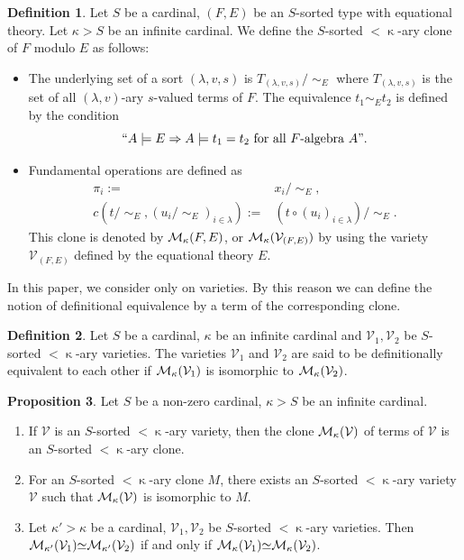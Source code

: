 \documentclass[a4paper,10pt]{article}
\theoremstyle{definition}
\newtheorem{df}{Definition}[section]
\newtheorem{prop}[df]{Proposition}
\newcommand\iso{{\simeq}}
\newcommand\mc{\mathclose}
\newcommand\V{\mathcal{V}}
\begin{document}
\begin{df}
Let $S$ be a cardinal, $(F,E)$ be an $S$-sorted type with equational theory.
Let $\kappa>S$ be an infinite cardinal.
We define the $S$-sorted $<\mc\kappa$-ary clone of $F$ modulo $E$ as follows:
\begin{itemize}
\item
The underlying set of a sort $(\lambda,v,s)$
is $T_{(\lambda,v,s)}/\mc\sim_E$ where
$T_{(\lambda,v,s)}$ is the set of all $(\lambda,v)$-ary $s$-valued terms of $F$.
The equivalence $t_1\sim_E t_2$
is defined by the condition
\[
``A\models E\Rightarrow A\models t_1=t_2\text{ for all }
F\text{-algebra }A".
\]
\item
Fundamental operations are defined as
\begin{align*}
\pi_i:=&x_i/\mc \sim_E, \\
c(t/\mc\sim_E,(u_i/\mc\sim_E)_{i\in\lambda})
:=&(t\circ (u_i)_{i\in \lambda})/\mc\sim_E.
\end{align*}
This clone is denoted by ${\cal M}_{\kappa}(F,E)$, or 
${\cal M}_\kappa(\V_{(F,E)})$ by using the variety $\V_{(F,E)}$
defined by the equational theory $E$.
\end{itemize}
\end{df}

In this paper, we consider only on varieties.
By this reason we can define the notion of definitional equivalence
by a term of the corresponding clone.
\begin{df}
Let $S$ be a cardinal, $\kappa$ be an infinite cardinal and
$\V_1,\V_2$ be $S$-sorted $<\mc\kappa$-ary varieties.
The varieties $\V_1$ and $\V_2$ are said to be definitionally equivalent to each other
if ${\cal M}_{\kappa}(\V_1)$ is isomorphic to ${\cal M}_\kappa(\V_2)$.
\end{df}

\begin{prop}
Let $S$ be a non-zero cardinal, $\kappa>S$ be an infinite cardinal.
\begin{enumerate}
\item
If $\V$ is an $S$-sorted $<\mc\kappa$-ary variety, then
the clone ${\cal M}_\kappa(\V)$ of terms of $\V$ is
an $S$-sorted $<\mc\kappa$-ary clone.
\item
For an $S$-sorted $<\mc\kappa$-ary clone $M$,
there exists an $S$-sorted $<\mc\kappa$-ary variety $\V$
such that ${\cal M}_{\kappa}(\V)$ is isomorphic to $M$.
\item
Let $\kappa'>\kappa$ be a cardinal,
$\V_1,\V_2$ be $S$-sorted $<\mc\kappa$-ary varieties.
Then ${\cal M}_{\kappa'}(\V_1)\iso{\cal M}_{\kappa'}(\V_2)$ if and only if
${\cal M}_{\kappa}(\V_1)\iso{\cal M}_{\kappa}(\V_2)$.
\end{enumerate}
\end{prop}
\end{document}
